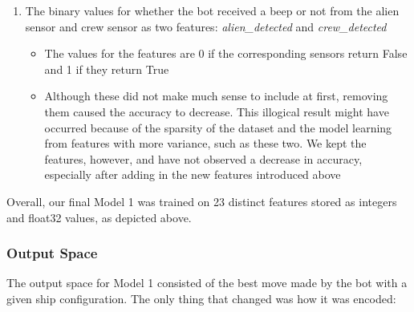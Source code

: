 \documentclass[11pt]{article}
\begin{document}
\begin{enumerate}
\begin{itemize}
    \end{itemize}
    \item The binary values for whether the bot received a beep or not from the alien sensor and crew sensor as two features: \emph{alien\_detected} and \emph{crew\_detected}
    \begin{itemize}
        \item The values for the features are 0 if the corresponding sensors return False and 1 if they return True
        \item Although these did not make much sense to include at first, removing them caused the accuracy to decrease. This illogical result might have occurred because of the sparsity of the dataset and the model learning from features with more variance, such as these two. We kept the features, however, and have not observed a decrease in accuracy, especially after adding in the new features introduced above
    \end{itemize}
\end{enumerate}

Overall, our final Model 1 was trained on 23 distinct features stored as integers and float32 values, as depicted above.

\subsubsection{Output Space}

The output space for Model 1 consisted of the best move made by the bot with a given ship configuration. The only thing that changed was how it was encoded:
\end{document}
